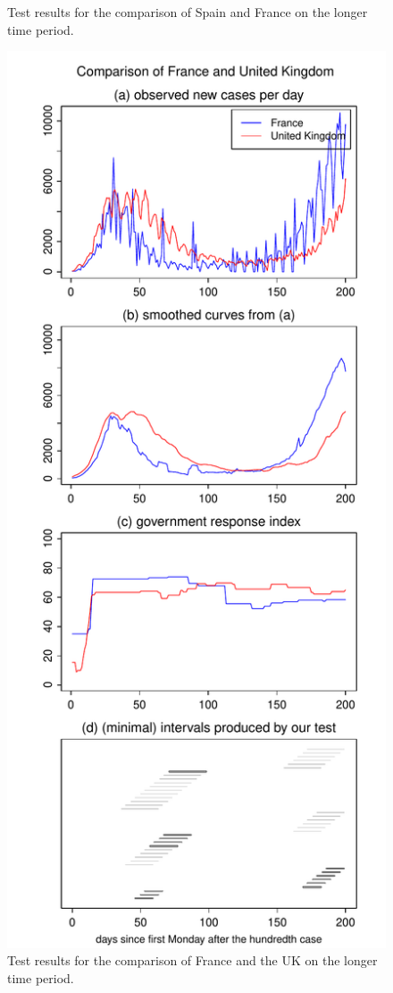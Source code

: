 \documentclass[a4paper,12pt]{article}
\numberwithin{equation}{section}
\begin{document}
\begin{figure}[p!]
\begin{minipage}[t]{0.49\textwidth}
\caption{Test results for the comparison of Spain and France on the longer time period.}
\end{minipage}
\hspace{0.25cm}
\begin{minipage}[t]{0.49\textwidth}
\includegraphics[width=\textwidth]{plots/FRA_vs_GBR_long}
\caption{Test results for the comparison of France and the UK on the longer time period.}\label{fig:supp3:last}
\end{minipage}
\end{figure}
\end{document}
